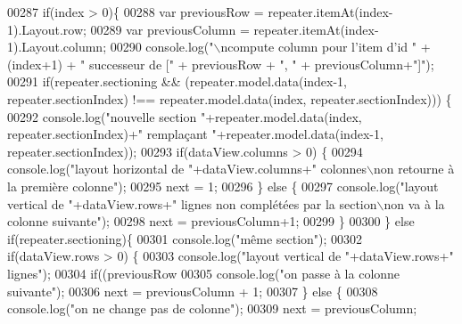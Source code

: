 \begin{DoxyCode}
{00287                 \textcolor{keywordflow}{if}(index > 0)\{
00288                     var previousRow = repeater.itemAt(index-1).Layout.row;
00289                     var previousColumn = repeater.itemAt(index-1).Layout.column;
00290                     console.log(\textcolor{stringliteral}{"\(\backslash\)ncompute column pour l'item d'id "} + (index+1) + \textcolor{stringliteral}{" successeur de ["} + 
      previousRow + \textcolor{stringliteral}{", "} + previousColumn+\textcolor{stringliteral}{"]"});
00291                     \textcolor{keywordflow}{if}(repeater.sectioning && (repeater.model.data(index-1, repeater.sectionIndex) !== 
      repeater.model.data(index, repeater.sectionIndex))) \{
00292                         console.log(\textcolor{stringliteral}{"nouvelle section "}+repeater.model.data(index, repeater.sectionIndex)+\textcolor{stringliteral}{"
       remplaçant "}+repeater.model.data(index-1, repeater.sectionIndex));
00293                         \textcolor{keywordflow}{if}(dataView.columns > 0) \{
00294                             console.log(\textcolor{stringliteral}{"layout horizontal de "}+dataView.columns+\textcolor{stringliteral}{" colonnes\(\backslash\)non retourne à
       la première colonne"});
00295                             next = 1;
00296                         \} \textcolor{keywordflow}{else} \{
00297                             console.log(\textcolor{stringliteral}{"layout vertical de "}+dataView.rows+\textcolor{stringliteral}{" lignes non complétées par la
       section\(\backslash\)non va à la colonne suivante"});
00298                             next = previousColumn+1;
00299                         \}
00300                     \} \textcolor{keywordflow}{else} \textcolor{keywordflow}{if}(repeater.sectioning)\{
00301                         console.log(\textcolor{stringliteral}{"même section"});
00302                         \textcolor{keywordflow}{if}(dataView.rows > 0) \{
00303                             console.log(\textcolor{stringliteral}{"layout vertical de "}+dataView.rows+\textcolor{stringliteral}{" lignes"});
00304                             \textcolor{keywordflow}{if}((previousRow %
00305                                 console.log(\textcolor{stringliteral}{"on passe à la colonne suivante"});
00306                                 next = previousColumn + 1;
00307                             \} \textcolor{keywordflow}{else} \{
00308                                 console.log(\textcolor{stringliteral}{"on ne change pas de colonne"});
00309                                 next = previousColumn;
}
\end{DoxyCode}
